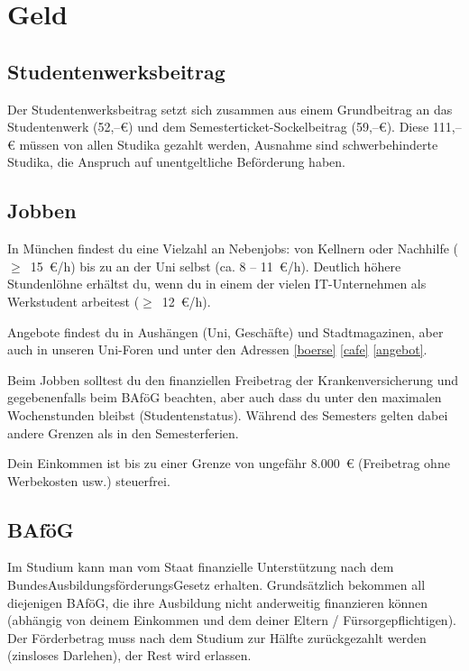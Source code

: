 ﻿\chapter{Geld}

\section{Studentenwerksbeitrag}
Der Studentenwerksbeitrag setzt sich zusammen aus einem Grundbeitrag an das Studentenwerk (52,--€) und dem
Semesterticket-Sockelbeitrag (59,--€).
Diese 111,--€ müssen von allen Studika gezahlt werden, Ausnahme sind schwerbehinderte Studika, die Anspruch
auf unentgeltliche Beförderung haben.

\section{Jobben}
In München findest du eine Vielzahl an Nebenjobs: von Kellnern oder Nachhilfe ($\geq$~15~€/h) bis zu an der Uni selbst (ca. 8 -- 11~€/h). Deutlich höhere Stundenlöhne erhältst du, wenn du in einem der vielen IT-Unternehmen als Werkstudent arbeitest ($\geq$~12~€/h).

Angebote findest du in Aushängen (Uni, Geschäfte) und Stadtmagazinen, aber auch in unseren Uni-Foren und unter den Adressen
\ref{boerse} \ref{cafe} \ref{angebot}.

Beim Jobben solltest du den finanziellen Freibetrag der Krankenversicherung und gegebenenfalls beim BAföG beachten, aber auch dass du unter den maximalen Wochenstunden bleibst (Studentenstatus). Während des Semesters gelten dabei andere Grenzen als in den Semesterferien.

Dein Einkommen ist bis zu einer Grenze von ungefähr 8.000~€ (Freibetrag ohne Werbekosten usw.) steuerfrei.

\begin{urlList}
\end{urlList}


\section{BAföG}
Im Studium kann man vom Staat finanzielle Unterstützung nach dem BundesAusbildungsförderungsGesetz erhalten. Grundsätzlich bekommen all diejenigen BAföG, die ihre Ausbildung nicht anderweitig finanzieren können (abhängig von deinem Einkommen und dem deiner Eltern / Fürsorgepflichtigen). Der Förderbetrag muss nach dem Studium zur Hälfte zurückgezahlt werden (zinsloses Darlehen), der Rest wird erlassen.

